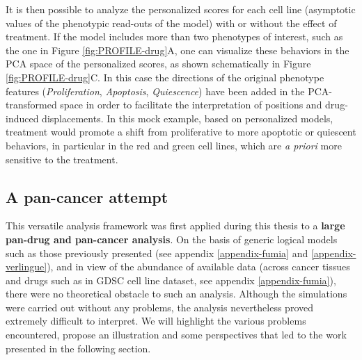 \documentclass[a4paper,12pt,twoside,onecolumn,openright,final,oldfontcommands]{memoir}
\begin{document}
It is then possible to analyze the personalized scores for each cell
line (asymptotic values of the phenotypic read-outs of the model) with
or without the effect of treatment. If the model includes more than two
phenotypes of interest, such as the one in Figure
\ref{fig:PROFILE-drug}A, one can visualize these behaviors in the PCA
space of the personalized scores, as shown schematically in Figure
\ref{fig:PROFILE-drug}C. In this case the directions of the original
phenotype features (\emph{Proliferation}, \emph{Apoptosis},
\emph{Quiescence}) have been added in the PCA-transformed space in order
to facilitate the interpretation of positions and drug-induced
displacements. In this mock example, based on personalized models,
treatment would promote a shift from proliferative to more apoptotic or
quiescent behaviors, in particular in the red and green cell lines,
which are \emph{a priori} more sensitive to the treatment.

\subsection{A pan-cancer attempt}\label{a-pan-cancer-attempt}

This versatile analysis framework was first applied during this thesis
to a \textbf{large pan-drug and pan-cancer analysis}. On the basis of
generic logical models such as those previously presented (see appendix
\ref{appendix-fumia} and \ref{appendix-verlingue}), and in view of the
abundance of available data (across cancer tissues and drugs such as in
GDSC cell line dataset, see appendix \ref{appendix-fumia}), there were
no theoretical obstacle to such an analysis. Although the simulations
were carried out without any problems, the analysis nevertheless proved
extremely difficult to interpret. We will highlight the various problems
encountered, propose an illustration and some perspectives that led to
the work presented in the following section.
\end{document}
